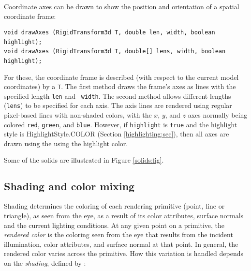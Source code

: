 Coordinate axes can be drawn to show the position and orientation of a
spatial coordinate frame:
%
\begin{lstlisting}[]
void drawAxes (RigidTransform3d T, double len, width, boolean highlight);
void drawAxes (RigidTransform3d T, double[] lens, width, boolean highlight);
\end{lstlisting}
%
For these, the coordinate frame is described (with respect to the current
model coordinates) by a 
 {\tt T}. The first method
draws the frame's axes
as lines with the specified length {\tt len} and {\tt
width}. The second method allows different lengths ({\tt lens}) to be
specified for each axis. The axis lines are rendered using regular
pixel-based lines with non-shaded colors, with the $x$, $y$, and $z$
axes normally being colored {\tt red}, {\tt green}, and {\tt blue}.
However, if {\tt highlight} is {\tt true} and the highlight
style is 
%
{HighlightStyle.COLOR}
(Section \ref{highlighting:sec}), then all axes are drawn
using the using the highlight color.

Some of the solids are illustrated in Figure \ref{solids:fig}.

\subsection{Shading and color mixing}
\label{shading:sec}

Shading determines the coloring of each rendering primitive (point,
line or triangle), as seen from the eye, as a result of its color
attributes, surface normals and the current lighting conditions. At
any given point on a primitive, the {\it rendered color} is the
coloring seen from the eye that results from the incident
illumination, color attributes, and surface normal at that point. In
general, the rendered color varies across the primitive.  How this
variation is handled depends on the {\it shading}, defined by
:

